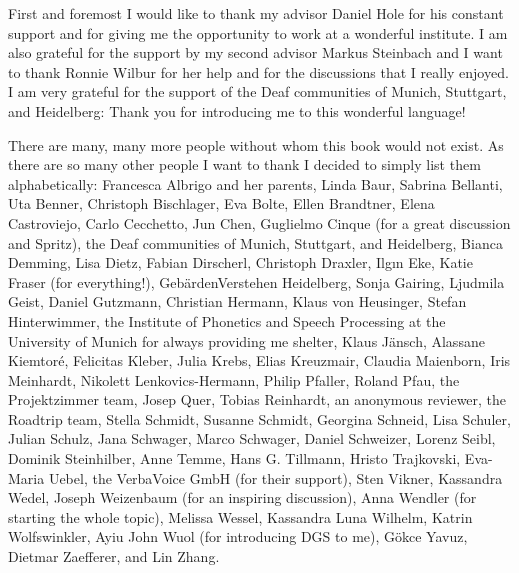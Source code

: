 \begin{refsection}

First and foremost I would like to thank my advisor Daniel Hole for his constant support and for giving me the opportunity to work at a wonderful institute. I am also grateful for the support by my second advisor Markus Steinbach and I want to thank Ronnie Wilbur for her help and for the discussions that I really enjoyed. I am very grateful for the support of the Deaf communities of Munich, Stuttgart, and Heidelberg: Thank you for introducing me to this wonderful language! 

There are many, many more people without whom this book would not exist. As there are so many other people I want to thank I decided to simply list them alphabetically: Francesca Albrigo and her parents, Linda Baur, Sabrina Bellanti, Uta Benner, Christoph Bischlager, Eva Bolte, Ellen Brandtner, Elena Castroviejo, Carlo Cecchetto, Jun Chen, Guglielmo Cinque (for a great discussion and Spritz), the Deaf communities of Munich, Stuttgart, and Heidelberg, Bianca Demming, Lisa Dietz, Fabian Dirscherl, Christoph Draxler, Ilg\i n Eke, Katie Fraser (for everything!), Geb\"ardenVerstehen Heidelberg, Sonja Gairing, Ljudmila Geist, Daniel Gutzmann, Christian Hermann, Klaus von Heusinger, Stefan Hinterwimmer, the Institute of Phonetics and Speech Processing at the University of Munich for always providing me shelter, Klaus J\"ansch, Alassane Kiemtor\'{e}, Felicitas Kleber, Julia Krebs, Elias Kreuzmair, Claudia Maienborn, Iris Meinhardt, Nikolett Lenkovics-Hermann, Philip Pfaller, Roland Pfau, the Projektzimmer team, Josep Quer, Tobias Reinhardt, an anonymous reviewer, the Roadtrip team, Stella Schmidt, Susanne Schmidt, Georgina Schneid, Lisa Schuler, Julian Schulz, Jana Schwager, Marco Schwager, Daniel Schweizer, Lorenz Seibl, Dominik Steinhilber, Anne Temme, Hans G. Tillmann, Hristo Trajkovski, Eva-Maria Uebel, the VerbaVoice GmbH (for their support), Sten Vikner, Kassandra Wedel, Joseph Weizenbaum (for an inspiring discussion), Anna Wendler (for starting the whole topic), Melissa Wessel, Kassandra Luna Wilhelm, Katrin Wolfswinkler, Ayiu John Wuol (for introducing DGS to me), G\"okce Yavuz, Dietmar Zaefferer, and Lin Zhang.



\printbibliography[heading=subbibliography]
\end{refsection}